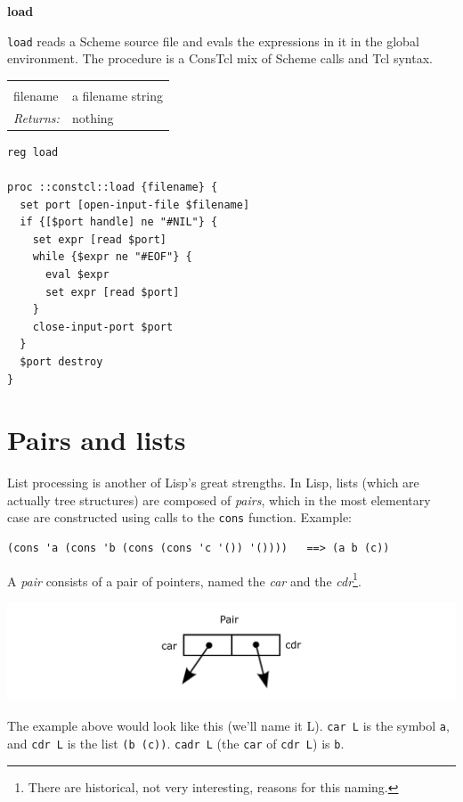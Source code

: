 \documentclass[twoside]{report}
\begin{document}
\textbf{load}

\texttt{load} reads a Scheme source file and evals the expressions in it in the global environment. The procedure is a ConsTcl mix of Scheme calls and Tcl syntax.

\noindent\begin{tabular}{ |p{1.9cm} p{8cm}| }
\hline
\rowcolor[HTML]{CCCCCC} \multicolumn{2}{|l|}{\bf load (public)} \\
filename & a filename string \\
\textit{Returns:} & nothing \\
\hline
\end{tabular}

\begin{lstlisting}
reg load

proc ::constcl::load {filename} {
  set port [open-input-file $filename]
  if {[$port handle] ne "#NIL"} {
    set expr [read $port]
    while {$expr ne "#EOF"} {
      eval $expr
      set expr [read $port]
    }
    close-input-port $port
  }
  $port destroy
}
\end{lstlisting}

\section{Pairs and lists}
\label{pairs-and-lists}

List processing is another of Lisp's great strengths. In Lisp, lists (which are actually tree structures) are composed of \emph{pairs}, which in the most elementary case are constructed using calls to the \texttt{cons} function. Example:

\begin{verbatim}
(cons 'a (cons 'b (cons (cons 'c '()) '())))   ==> (a b (c))
\end{verbatim}

A \emph{pair} consists of a pair of pointers, named the \emph{car} and the \emph{cdr}\footnote{There are historical, not very interesting, reasons for this naming.}.

\includegraphics{images/pair.png}

The example above would look like this (we'll name it L). \texttt{car L} is the symbol \texttt{a}, and \texttt{cdr L} is the list \texttt{(b (c))}. \texttt{cadr L} (the \texttt{car} of \texttt{cdr L}) is \texttt{b}.
\end{document}
